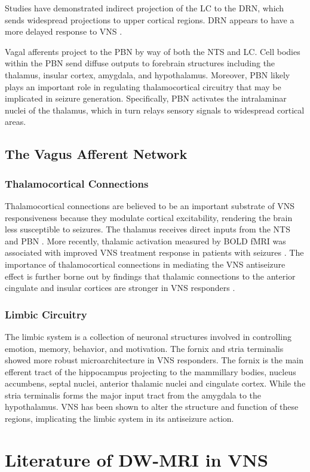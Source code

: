   Studies have demonstrated indirect projection of the LC to the DRN, which sends widespread projections to upper cortical regions. DRN appears to have a more delayed response to VNS \cite{HanchemWongIbrahim2018}.

  Vagal afferents project to the PBN by way of both the NTS and LC. Cell bodies within the PBN send diffuse outputs to forebrain structures including the thalamus, insular cortex, amygdala, and hypothalamus. Moreover, PBN likely plays an important role in regulating thalamocortical circuitry that may be implicated in seizure generation. Specifically, PBN activates the intralaminar nuclei of the thalamus, which in turn relays sensory signals to widespread cortical areas. \cite{HanchemWongIbrahim2018}

  \subsection*{The Vagus Afferent Network}
  \subsubsection*{Thalamocortical Connections}
  Thalamocortical connections are believed to be an important substrate of VNS responsiveness because they modulate cortical excitability, rendering the brain less susceptible to seizures. The thalamus receives direct inputs from the NTS and PBN \cite{BecksteadJoel2980}. More recently, thalamic activation measured by BOLD fMRI was associated with improved VNS treatment response in patients with seizures \cite{NarayananWatts2002}. The importance of thalamocortical connections in mediating the VNS antiseizure effect is further borne out by findings that thalamic connections to the anterior cingulate and insular cortices are stronger in VNS responders \cite{IBRAHIM2017634}. %

  \subsubsection*{Limbic Circuitry}
  The limbic system is a collection of neuronal structures involved in controlling emotion, memory, behavior, and motivation. The fornix and stria terminalis showed more robust microarchitecture in VNS responders. The fornix is the main efferent tract of the hippocampus projecting to the mammillary bodies, nucleus accumbens, septal nuclei, anterior thalamic nuclei and cingulate cortex. While the stria terminalis forms the major input tract from the amygdala to the hypothalamus. 
  VNS has been shown to alter the structure and function of these regions, implicating the limbic system in its antiseizure action. \cite{Mithani2019}

\section{Literature of DW-MRI in VNS}
